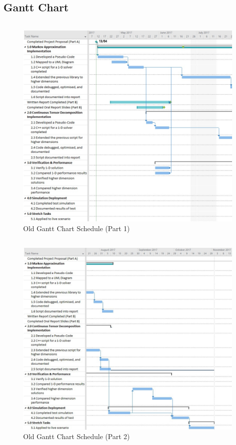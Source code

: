 \documentclass[11pt,draftd]{article}
\begin{document}
\begin{appendices}
	\section{Gantt Chart}\label{app_itemA}
	\[\]
	\[\]
	\[\]
	\begin{figure}[h]
		\centering
		\includegraphics[scale=.6]{OldGanttPart1}
		\caption{Old Gantt Chart Schedule (Part 1)}
	\end{figure}
	\newpage
	\[\]
	\[\]
	\[\]
	\begin{figure}[h]
		\centering
		\includegraphics[scale=.6]{OldGanttPart2}
		\caption{Old Gantt Chart Schedule (Part 2)}
	\end{figure}
	\newpage

\end{appendices}
\end{document}
